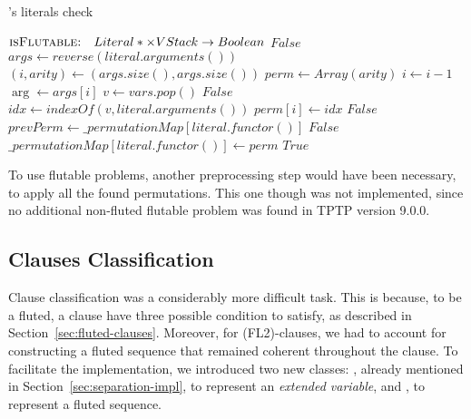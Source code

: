 \begin{algorithm}[H]
  \caption{'s literals check}\label{alg:formula-classifier-literals-flutable}
  \begin{algorithmic}[1]
      \Statex{}  \(\textsc{isFlutable:} \quad Literal* \times VStack\to Boolean\)
            \State{} \Return{} \(False\)
          \EndIf{}
          \State{} \(args \gets reverse(literal.arguments())\)
          \State{} \((i,arity) \gets (args.size(),args.size())\)
          \State{} \(perm \gets Array(arity)\)
              \State{} \(i \gets i - 1\)
              \State{} \(\arg \gets args[i]\)
              \State{} \(v \gets vars.pop()\)
                  \State{} \Return{} \(False\)
              \EndIf{}
              \State{} \(idx \gets indexOf(v, literal.arguments())\)
              \State{} \(perm[i] \gets idx\)
          \EndWhile{}
            \State{} \Return{} \(False\)
          \EndIf{}
          \State{} \(prevPerm \gets \_permutationMap[literal.functor()]\)
              \State{} \Return{} \(False\)
            \EndIf{}
          \Else{}
            \State{} \(\_permutationMap[literal.functor()] \gets perm\)
          \EndIf{}
          \State{} \Return{} \(True\)
      \EndFunction{}
  \end{algorithmic}
\end{algorithm}

To use flutable problems, another preprocessing step would have been necessary, to apply all the found permutations.
This one though was not implemented, since no additional non-fluted flutable problem was found in TPTP version 9.0.0.

\subsection{Clauses Classification}\label{subsec:clauses-classification}

Clause classification was a considerably more difficult task. This is because, to be a fluted, a clause have three possible condition to satisfy, as described in Section~\ref{sec:fluted-clauses}.
Moreover, for (FL2)-clauses, we had to account for constructing a fluted sequence that remained coherent throughout the clause.
To facilitate the implementation, we introduced two new classes: , already mentioned in Section~\ref{sec:separation-impl}, to represent an \emph{extended variable}, and , to represent a fluted sequence.

